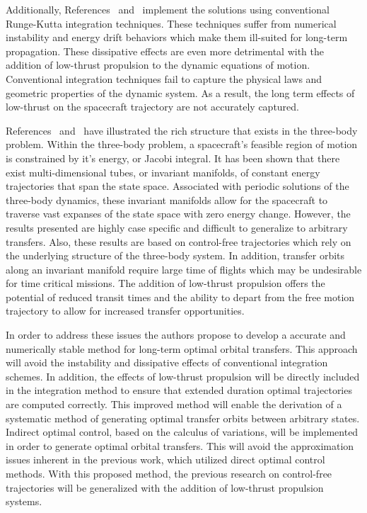 \documentclass[letterpaper, preprint, paper,11pt]{AAS}	%
\begin{document}
Additionally, References~ and~ implement the solutions using conventional Runge-Kutta integration techniques.
These techniques suffer from numerical instability and energy drift behaviors which make them ill-suited for long-term propagation.
These dissipative effects are even more detrimental with the addition of low-thrust propulsion to the dynamic equations of motion.
Conventional integration techniques fail to capture the physical laws and geometric properties of the dynamic system.
As a result, the long term effects of low-thrust on the spacecraft trajectory are not accurately captured. 

References~ and~ have illustrated the rich structure that exists in the three-body problem.
Within the three-body problem, a spacecraft's feasible region of motion is constrained by it's energy, or Jacobi integral. 
It has been shown that there exist multi-dimensional tubes, or invariant manifolds, of constant energy trajectories that span the state space. 
Associated with periodic solutions of the three-body dynamics, these invariant manifolds allow for the spacecraft to traverse vast expanses of the state space with zero energy change. 
However, the results presented are highly case specific and difficult to generalize to arbitrary transfers.
Also, these results are based on control-free trajectories which rely on the underlying structure of the three-body system.
In addition, transfer orbits along an invariant manifold require large time of flights which may be undesirable for time critical missions.
The addition of low-thrust propulsion offers the potential of reduced transit times and the ability to depart from the free motion trajectory to allow for increased transfer opportunities. 

In order to address these issues the authors propose to develop a accurate and numerically stable method for long-term optimal orbital transfers.
This approach will avoid the instability and dissipative effects of conventional integration schemes.
In addition, the effects of low-thrust propulsion will be directly included in the integration method to ensure that extended duration optimal trajectories are computed correctly.
This improved method will enable the derivation of a systematic method of generating optimal transfer orbits between arbitrary states.
Indirect optimal control, based on the calculus of variations, will be implemented in order to generate optimal orbital transfers.
This will avoid the approximation issues inherent in the previous work, which utilized direct optimal control methods.
With this proposed method, the previous research on control-free trajectories will be generalized with the addition of low-thrust propulsion systems.
\end{document}
